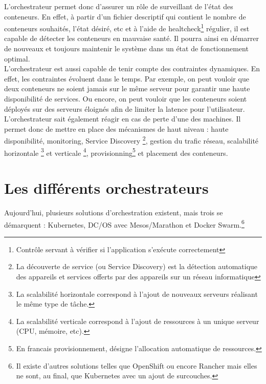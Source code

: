 \documentclass[11pt,fleqn]{book} %
\begin{document}
L'orchestrateur permet donc d'assurer un rôle de surveillant de l'état des conteneurs. En effet, à partir d'un fichier descriptif qui contient le nombre de conteneurs souhaités, l'état désiré, etc et à l'aide de healtcheck\footnote{Contrôle servant à vérifier si l'application s'exécute correctement} régulier, il est capable de détecter les conteneurs en mauvaise santé. Il pourra ainsi en démarrer de nouveaux et toujours maintenir le système dans un état de fonctionnement optimal.\\
L'orchestrateur est aussi capable de tenir compte des contraintes dynamiques. En effet, les contraintes évoluent dans le temps. Par exemple, on peut vouloir que deux conteneurs ne soient jamais sur le même serveur pour garantir une haute disponibilité de services. Ou encore, on peut vouloir que les conteneurs soient déployés sur des serveurs éloignés afin de limiter la latence pour l'utilisateur. L'orchestrateur sait également réagir en cas de perte d'une des machines. Il permet donc de mettre en place des mécanismes de haut niveau : haute disponibilité, monitoring, Service Discovery \footnote{La découverte de service (ou Service Discovery) est la détection automatique des appareils et services offerts par des appareils sur un réseau informatique}, gestion du trafic réseau,  scalabilité horizontale \footnote{La scalabilité horizontale correspond à l'ajout de nouveaux serveurs réalisant le même type de tâche.} et verticale \footnote{La scalabilité verticale correspond à l'ajout de ressources à un unique serveur (CPU, mémoire, etc).}, provisionning\footnote{En francais provisionnement, désigne l'allocation automatique de ressources.} et placement des conteneurs.\\



\section{Les différents orchestrateurs}
Aujourd'hui, plusieurs solutions d'orchestration existent, mais trois se démarquent : Kubernetes, DC/OS avec Mesos/Marathon et  Docker Swarm.\footnote{Il existe d'autres solutions telles que OpenShift ou encore Rancher mais elles ne sont, au final, que Kubernetes avec un ajout de surcouches.}
\end{document}
